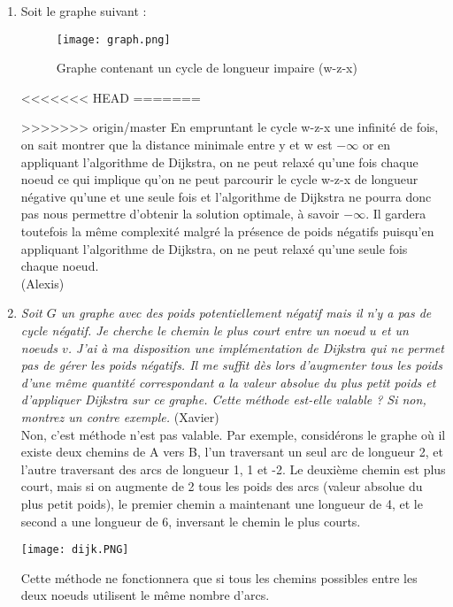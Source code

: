 \documentclass[11pt]{article}
\begin{document}
\begin{enumerate}
(Alexis)\\

\item Soit le graphe suivant :\\

\begin{figure}[h!]
    \center
    \texttt{[image: graph.png]}
    \caption{Graphe contenant un cycle de longueur impaire (w-z-x)}
\end{figure}
<<<<<<< HEAD
=======

>>>>>>> origin/master
En empruntant le cycle w-z-x une infinité de fois, on sait montrer que 
la distance minimale entre y et w est $ -\infty $ 
or en appliquant l'algorithme de Dijkstra, 
on ne peut relaxé qu'une fois chaque noeud ce qui implique qu'on ne peut parcourir
le cycle w-z-x de longueur négative qu'une et une seule fois et l'algorithme 
de Dijkstra ne pourra donc pas nous permettre d'obtenir la solution optimale,
 à savoir $ -\infty $. Il gardera toutefois la même complexité malgré la présence de poids négatifs puisqu'en appliquant 
 l'algorithme de Dijkstra, on ne peut relaxé qu'une seule fois chaque noeud.\\

(Alexis)\\

\item \textit{Soit $G$ un graphe avec des poids potentiellement négatif mais il n’y a pas de
cycle négatif. Je cherche le chemin le plus court entre un noeud $u$ et un noeuds $v$.
J’ai à ma disposition une implémentation de Dijkstra qui ne permet pas de gérer
les poids négatifs. Il me suffit dès lors d’augmenter tous les poids d’une même
quantité correspondant a la valeur absolue du plus petit poids et d’appliquer
Dijkstra sur ce graphe. Cette méthode est-elle valable ? Si non, montrez un contre
exemple.} (Xavier)\\

Non, c'est méthode n'est pas valable. Par exemple, considérons le graphe où il existe deux chemins de A vers B, l'un traversant un seul arc de longueur 2, et l'autre traversant des arcs de longueur 1, 1 et -2. Le deuxième chemin est plus court, mais si on augmente de 2 tous les poids des arcs (valeur absolue du plus petit poids), le premier chemin a maintenant une longueur de 4, et le second a une longueur de 6, inversant le chemin le plus courts.
\begin{center}
\texttt{[image: dijk.PNG]} 
\end{center}
Cette méthode ne fonctionnera que si tous les chemins possibles entre les deux noeuds utilisent le même nombre d'arcs.\\


\end{enumerate}
\end{document}
